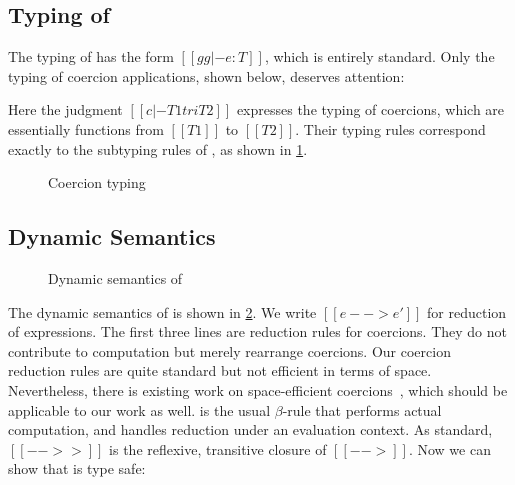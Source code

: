 

\subsection{Typing of \tname}

The typing of \tname has the form $[[gg |- e : T]]$, which is entirely standard. Only the typing of coercion
applications, shown below, deserves attention:
\begin{mathpar}
\end{mathpar}
Here the judgment $[[c |- T1 tri T2]]$ expresses the typing of coercions, which
are essentially functions from $[[T1]]$ to $[[T2]]$. Their typing
rules correspond exactly to the subtyping rules of \namee, as
shown in \cref{fig:co}.

\begin{figure}[t]
  \centering
  \caption{Coercion typing}
  \label{fig:co}
\end{figure}


\subsection{Dynamic Semantics}

\begin{figure}[t]
  \centering
{}
  \caption{Dynamic semantics of \tname}
  \label{fig:coercion_red}
\end{figure}

The dynamic semantics of \tname is shown in \cref{fig:coercion_red}. We write
$[[e --> e']]$ for reduction of expressions. The first three lines are reduction
rules for coercions. They do not contribute to computation but merely rearrange
coercions. Our coercion reduction rules are quite standard but not efficient in
terms of space. Nevertheless, there is existing work on space-efficient
coercions~\citep{Siek_2015, herman2010space}, which should be applicable to our
work as well.  is the usual $\beta$-rule that performs actual
computation, and  handles reduction under an evaluation context. As
standard, $[[-->>]]$ is the reflexive, transitive closure of $[[-->]]$.
Now we can show that \tname is type safe:

